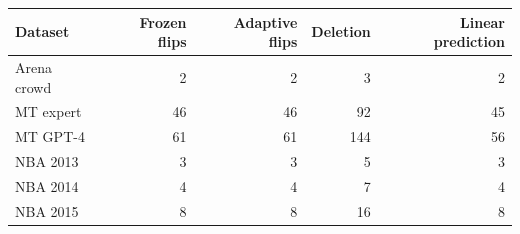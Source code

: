 \begin{tabular}{lrrrr}
\toprule
Dataset & Frozen flips & Adaptive flips & Deletion & Linear prediction \\
\midrule
Arena crowd & 2 & 2 & 3 & 2 \\
MT expert & 46 & 46 & 92 & 45 \\
MT GPT-4 & 61 & 61 & 144 & 56 \\
NBA 2013 & 3 & 3 & 5 & 3 \\
NBA 2014 & 4 & 4 & 7 & 4 \\
NBA 2015 & 8 & 8 & 16 & 8 \\
\bottomrule
\end{tabular}
